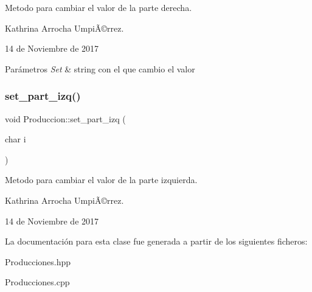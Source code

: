 Metodo para cambiar el valor de la parte derecha.

Kathrina Arrocha UmpiÃ©rrez.

14 de Noviembre de 2017 
\begin{DoxyParams}{Parámetros}
{\em Set} & string con el que cambio el valor \\
\hline
\end{DoxyParams}
\mbox{\label{class_produccion_a9bb0be1c947951dd47a2527ada53defc}} 
\subsubsection{\texorpdfstring{set\+\_\+part\+\_\+izq()}{set\_part\_izq()}}
{\footnotesize\ttfamily void Produccion\+::set\+\_\+part\+\_\+izq (\begin{DoxyParamCaption}\item[{char}]{i }\end{DoxyParamCaption})}

Metodo para cambiar el valor de la parte izquierda.

Kathrina Arrocha UmpiÃ©rrez.

14 de Noviembre de 2017 

La documentación para esta clase fue generada a partir de los siguientes ficheros\+:\begin{DoxyCompactItemize}
\item 
Producciones.\+hpp\item 
Producciones.\+cpp\end{DoxyCompactItemize}
